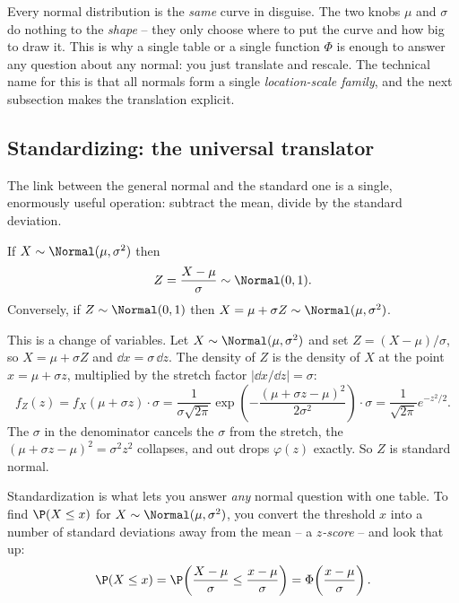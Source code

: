 \begin{happeningbox}
Every normal distribution is the \emph{same} curve in disguise. The two knobs
$\mu$ and $\sigma$ do nothing to the \emph{shape} -- they only choose where to put
the curve and how big to draw it. This is why a single table or a single function
$\Phi$ is enough to answer any question about any normal: you just translate and
rescale. The technical name for this is that all normals form a single
\emph{location-scale family}, and the next subsection makes the translation
explicit.
\end{happeningbox}

\subsection{Standardizing: the universal translator}
\label{ch12:standardize}

The link between the general normal and the standard one is a single, enormously
useful operation: subtract the mean, divide by the standard deviation.

\begin{theorem}[Standardization]
\label{ch12:thm-standardize}
If $X \sim \Normal(\mu, \sigma^2)$ then
\[
  Z = \frac{X - \mu}{\sigma} \sim \Normal(0,1).
\]
Conversely, if $Z \sim \Normal(0,1)$ then $X = \mu + \sigma Z \sim \Normal(\mu,\sigma^2)$.
\end{theorem}

\begin{whybox}
This is a change of variables. Let $X \sim \Normal(\mu,\sigma^2)$ and set
$Z = (X-\mu)/\sigma$, so $X = \mu + \sigma Z$ and $\dd x = \sigma\,\dd z$. The
density of $Z$ is the density of $X$ at the point $x = \mu + \sigma z$, multiplied
by the stretch factor $|\dd x/\dd z| = \sigma$:
\[
  f_Z(z) = f_X(\mu + \sigma z)\cdot \sigma
         = \frac{1}{\sigma\sqrt{2\pi}}\exp\!\left(-\frac{(\mu+\sigma z - \mu)^2}{2\sigma^2}\right)\cdot \sigma
         = \frac{1}{\sqrt{2\pi}} e^{-z^2/2}.
\]
The $\sigma$ in the denominator cancels the $\sigma$ from the stretch, the
$(\mu + \sigma z - \mu)^2 = \sigma^2 z^2$ collapses, and out drops $\varphi(z)$
exactly. So $Z$ is standard normal.
\end{whybox}

Standardization is what lets you answer \emph{any} normal question with one table.
To find $\P(X \le x)$ for $X \sim \Normal(\mu,\sigma^2)$, you convert the
threshold $x$ into a number of standard deviations away from the mean -- a
\emph{$z$-score} -- and look that up:
\[
  \P(X \le x) = \P\!\left(\frac{X-\mu}{\sigma} \le \frac{x-\mu}{\sigma}\right)
              = \Phi\!\left(\frac{x-\mu}{\sigma}\right).
\]

